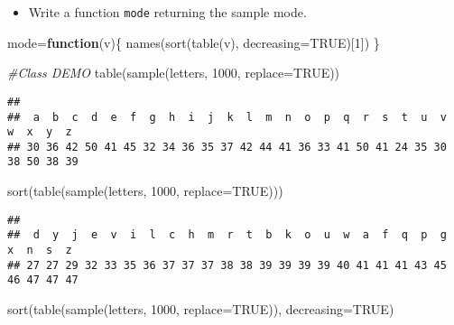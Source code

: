 \documentclass[
]{article}
\newenvironment{Shaded}{\begin{snugshade}}{\end{snugshade}}
\newcommand{\AttributeTok}[1]{\textcolor[rgb]{0.77,0.63,0.00}{#1}}
\newcommand{\CommentTok}[1]{\textcolor[rgb]{0.56,0.35,0.01}{\textit{#1}}}
\newcommand{\ConstantTok}[1]{\textcolor[rgb]{0.00,0.00,0.00}{#1}}
\newcommand{\ControlFlowTok}[1]{\textcolor[rgb]{0.13,0.29,0.53}{\textbf{#1}}}
\newcommand{\DecValTok}[1]{\textcolor[rgb]{0.00,0.00,0.81}{#1}}
\newcommand{\FunctionTok}[1]{\textcolor[rgb]{0.00,0.00,0.00}{#1}}
\newcommand{\NormalTok}[1]{#1}
\newcommand{\OtherTok}[1]{\textcolor[rgb]{0.56,0.35,0.01}{#1}}
\providecommand{\tightlist}{%
  \setlength{\itemsep}{0pt}\setlength{\parskip}{0pt}}
\begin{document}
\begin{itemize}
\tightlist
\item
  Write a function \texttt{mode} returning the sample mode.
\end{itemize}

\begin{Shaded}
\begin{Highlighting}[]
\NormalTok{mode}\OtherTok{=}\ControlFlowTok{function}\NormalTok{(v)\{}
  \FunctionTok{names}\NormalTok{(}\FunctionTok{sort}\NormalTok{(}\FunctionTok{table}\NormalTok{(v), }\AttributeTok{decreasing=}\ConstantTok{TRUE}\NormalTok{)[}\DecValTok{1}\NormalTok{])}
\NormalTok{\}}

\CommentTok{\#Class DEMO}
\FunctionTok{table}\NormalTok{(}\FunctionTok{sample}\NormalTok{(letters, }\DecValTok{1000}\NormalTok{, }\AttributeTok{replace=}\ConstantTok{TRUE}\NormalTok{))}
\end{Highlighting}
\end{Shaded}

\begin{verbatim}
## 
##  a  b  c  d  e  f  g  h  i  j  k  l  m  n  o  p  q  r  s  t  u  v  w  x  y  z 
## 30 36 42 50 41 45 32 34 36 35 37 42 44 41 36 33 41 50 41 24 35 30 38 50 38 39
\end{verbatim}

\begin{Shaded}
\begin{Highlighting}[]
\FunctionTok{sort}\NormalTok{(}\FunctionTok{table}\NormalTok{(}\FunctionTok{sample}\NormalTok{(letters, }\DecValTok{1000}\NormalTok{, }\AttributeTok{replace=}\ConstantTok{TRUE}\NormalTok{)))}
\end{Highlighting}
\end{Shaded}

\begin{verbatim}
## 
##  d  y  j  e  v  i  l  c  h  m  r  t  b  k  o  u  w  a  f  q  p  g  x  n  s  z 
## 27 27 29 32 33 35 36 37 37 37 38 38 39 39 39 39 40 41 41 41 43 45 46 47 47 47
\end{verbatim}

\begin{Shaded}
\begin{Highlighting}[]
\FunctionTok{sort}\NormalTok{(}\FunctionTok{table}\NormalTok{(}\FunctionTok{sample}\NormalTok{(letters, }\DecValTok{1000}\NormalTok{, }\AttributeTok{replace=}\ConstantTok{TRUE}\NormalTok{)), }\AttributeTok{decreasing=}\ConstantTok{TRUE}\NormalTok{)}
\end{Highlighting}
\end{Shaded}
\end{document}

